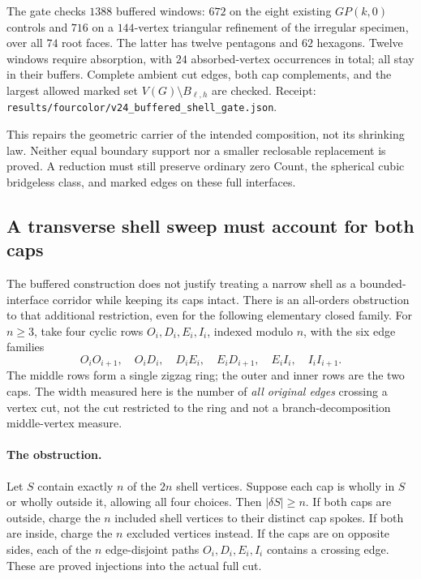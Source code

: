 The gate checks $1388$ buffered windows: $672$ on the eight existing
$GP(k,0)$ controls and $716$ on a $144$-vertex triangular refinement of
the irregular specimen, over all $74$ root faces. The latter has twelve
pentagons and $62$ hexagons. Twelve windows require absorption, with
$24$ absorbed-vertex occurrences in total; all stay in their buffers.
Complete ambient cut edges, both cap complements, and the largest
allowed marked set $V(G)\setminus B_{\ell,h}$ are checked. Receipt:
\texttt{results/fourcolor/v24\_buffered\_shell\_gate.json}.

This repairs the geometric carrier of the intended composition, not
its shrinking law. Neither equal boundary support nor a smaller
reclosable replacement is proved. A reduction must still preserve
ordinary zero Count, the spherical cubic bridgeless class, and marked
edges on these full interfaces.

\subsection{A transverse shell sweep must account for both caps}
\label{sec:unsplit-cap-sweep}

The buffered construction does not justify treating a narrow shell as
a bounded-interface corridor while keeping its caps intact. There is
an all-orders obstruction to that additional restriction, even for the
following elementary closed family. For $n\geq3$, take four cyclic rows
$O_i,D_i,E_i,I_i$, indexed modulo $n$, with the six edge families
\[
 O_iO_{i+1},\quad O_iD_i,\quad D_iE_i,\quad
 E_iD_{i+1},\quad E_iI_i,\quad I_iI_{i+1}.
\]
The middle rows form a single zigzag ring; the outer and inner rows are
the two caps. The width measured here is the number of \emph{all original
edges} crossing a vertex cut, not the cut restricted to the ring and
not a branch-decomposition middle-vertex measure.

\paragraph{The obstruction.}
Let $S$ contain exactly $n$ of the $2n$ shell vertices. Suppose each cap
is wholly in $S$ or wholly outside it, allowing all four choices.
Then $|\delta S|\geq n$. If both caps are outside, charge the $n$
included shell vertices to their distinct cap spokes. If both are
inside, charge the $n$ excluded vertices instead. If the caps are on
opposite sides, each of the $n$ edge-disjoint paths
$O_i,D_i,E_i,I_i$ contains a crossing edge. These are proved injections
into the actual full cut.

